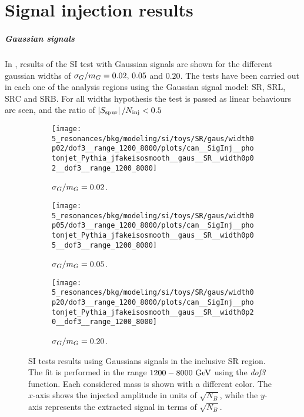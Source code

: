 \chapter{Signal injection results}
\label{app:si_results}


\paragraph{Gaussian signals}

In \Figrange{\ref{fig:si_results:siginj_gaus_SR}}{\ref{fig:si_results:siginj_gaus_SRB}}, results of the \ac{SI} test with Gaussian signals are shown for the different gaussian widths of \(\sigma_G/m_{G} = 0.02, \, 0.05\) and \(0.20\). The tests have been carried out in each one of the analysis regions using the Gaussian signal model: SR, SRL, SRC and SRB. For all widths hypothesis the test is passed as linear behaviours are seen, and the ratio of \(\left|S_{\text{spur}}\right| / N_{\text{inj}} < 0.5\) 


\begin{figure}[ht!]
    \centering
    \begin{subfigure}[h]{0.32\linewidth}
        \centering
        \texttt{[image: 5\_resonances/bkg/modeling/si/toys/SR/gaus/width0p02/dof3\_\_range\_1200\_8000/plots/can\_\_SigInj\_\_photonjet\_Pythia\_jfakeisosmooth\_\_gaus\_\_SR\_\_width0p02\_\_dof3\_\_range\_1200\_8000]}
        \caption{\(\sigma_G/m_{G} = 0.02\).}
    \end{subfigure}
    \hfill
    \begin{subfigure}[h]{0.32\linewidth}
        \centering
        \texttt{[image: 5\_resonances/bkg/modeling/si/toys/SR/gaus/width0p05/dof3\_\_range\_1200\_8000/plots/can\_\_SigInj\_\_photonjet\_Pythia\_jfakeisosmooth\_\_gaus\_\_SR\_\_width0p05\_\_dof3\_\_range\_1200\_8000]}
        \caption{\(\sigma_G/m_{G} = 0.05\).}
    \end{subfigure}
    \hfill
    \begin{subfigure}[h]{0.32\linewidth}
        \centering
        \texttt{[image: 5\_resonances/bkg/modeling/si/toys/SR/gaus/width0p20/dof3\_\_range\_1200\_8000/plots/can\_\_SigInj\_\_photonjet\_Pythia\_jfakeisosmooth\_\_gaus\_\_SR\_\_width0p20\_\_dof3\_\_range\_1200\_8000]}
        \caption{\(\sigma_G/m_{G} = 0.20\).}
    \end{subfigure}
    \caption{\ac{SI} tests results using Gaussians signals in the inclusive SR region. The fit is performed in the range \(1200-8000~\text{GeV}\) using the \textit{dof3} function. Each considered mass is shown with a different color. The \(x\)-axis shows the injected amplitude in units of \(\sqrt{N_B}\), while the \(y\)-axis represents the extracted signal in terms of \(\sqrt{N_B}\).}
    \label{fig:si_results:siginj_gaus_SR}
\end{figure}

